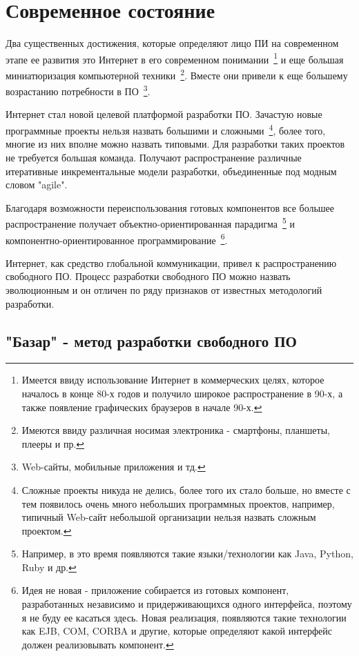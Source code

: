 \section{Современное состояние}

Два существенных достижения, которые определяют лицо ПИ на современном этапе ее развития это Интернет в его современном понимании~\footnote{Имеется ввиду использование Интернет в коммерческих целях, которое началось в конце 80-х годов и получило широкое распространение в 90-х, а также появление графических браузеров в начале 90-х.} и еще большая миниатюризация компьютерной техники~\footnote{Имеются ввиду различная носимая электроника - смартфоны, планшеты, плееры и пр.}. Вместе они привели к еще большему возрастанию потребности в ПО~\footnote{Web-сайты, мобильные приложения и тд.}.

Интернет стал новой целевой платформой разработки ПО. Зачастую новые программные проекты нельзя назвать большими и сложными~\footnote{Сложные проекты никуда не делись, более того их стало больше, но вместе с тем появилось очень много небольших программных проектов, например, типичный Web-сайт небольшой организации нельзя назвать сложным проектом.}, более того, многие из них вполне можно назвать типовыми. Для разработки таких проектов не требуется большая команда. Получают распространение различные итеративные инкрементальные модели разработки, объединенные под модным словом "agile".

Благодаря возможности переиспользования готовых компонентов все большее распространение получает объектно-ориентированная парадигма~\footnote{Например, в это время появляются такие языки/технологии как Java, Python, Ruby и др.} и компонентно-ориентированное программирование~\footnote{Идея не новая - приложение собирается из готовых компонент, разработанных независимо и придерживающихся одного интерфейса, поэтому я не буду ее касаться здесь. Новая реализация, появляются такие технологии как EJB, COM, CORBA и другие, которые определяют какой интерфейс должен реализовывать компонент.}.

Интернет, как средство глобальной коммуникации, привел к распространению свободного ПО. Процесс разработки свободного ПО можно назвать эволюционным и он отличен по ряду признаков от известных методологий разработки.

\subsection{"Базар" - метод разработки свободного ПО}

